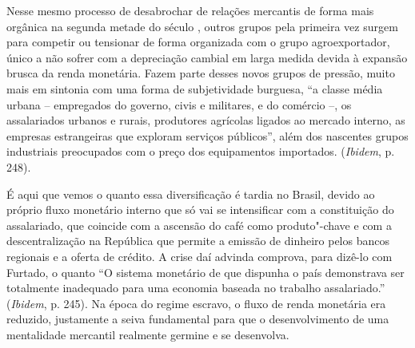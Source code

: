 Nesse mesmo processo de desabrochar de relações mercantis de forma mais
orgânica na segunda metade do século , outros grupos pela primeira
vez surgem para competir ou tensionar de forma organizada com o grupo
agroexportador, único a não sofrer com a depreciação cambial em larga
medida devida à expansão brusca da renda monetária. Fazem parte desses
novos grupos de pressão, muito mais em sintonia com uma forma de
subjetividade burguesa, ``a classe média urbana -- empregados do
governo, civis e militares, e do comércio --, os assalariados urbanos e
rurais, produtores agrícolas ligados ao mercado interno, as empresas
estrangeiras que exploram serviços públicos'', além dos nascentes grupos
industriais preocupados com o preço dos equipamentos importados.
(\emph{Ibidem}, p. 248).

É aqui que vemos o quanto essa diversificação é tardia no Brasil, devido
ao próprio fluxo monetário interno que só vai se intensificar com a
constituição do assalariado, que coincide com a ascensão do café como
produto"-chave e com a descentralização na República que permite a
emissão de dinheiro pelos bancos regionais e a oferta de crédito. A
crise daí advinda comprova, para dizê-lo com Furtado, o quanto ``O
sistema monetário de que dispunha o país demonstrava ser totalmente
inadequado para uma economia baseada no trabalho assalariado.''
(\emph{Ibidem}, p. 245). Na época do regime escravo, o fluxo de renda
monetária era reduzido, justamente a seiva fundamental para que o desenvolvimento
de uma mentalidade mercantil realmente germine e se desenvolva.

